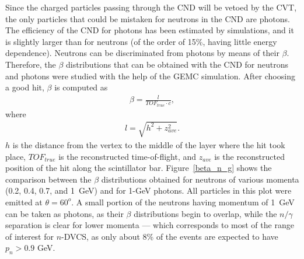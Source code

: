 Since the charged particles passing through the CND will be vetoed by the CVT, the only particles that could be mistaken for neutrons in the CND are photons. The efficiency of the CND for photons has been estimated by simulations, and it is slightly larger than for neutrons (of the order of 15\%, having little energy dependence). 
Neutrons can be discriminated from photons by means of their $\beta$.
Therefore, the $\beta$ distributions that can be obtained with the CND for neutrons and photons were studied with the help of the GEMC simulation.
After choosing a good hit, $\beta$ is computed as  %
%
\begin{eqnarray}\label{beta_def}
\beta = \frac{l}{TOF_{true}\cdot c},
\end{eqnarray}
%
where 
\begin{eqnarray}\label{l_def} 
l = \sqrt{h^{2}+z_{ave}^{2}}.
\end{eqnarray}
%
$h$ is the distance from the vertex to the middle of the layer where the hit took place, $TOF_{true}$ is the reconstructed time-of-flight, and $z_{ave}$ is the reconstructed position of the hit along the scintillator bar. %
%
Figure~\ref{beta_n_g} shows the comparison between the $\beta$ distributions obtained for neutrons of various momenta (0.2, 0.4, 0.7, and 1~GeV) and for 1-GeV photons. All particles in this plot were emitted at $\theta = 60^o$.
A small portion of the neutrons having momentum of 1~GeV can be taken as photons, as their $\beta$ distributions begin to overlap, while the $n/\gamma$ separation is clear for lower momenta --- which corresponds to most of the range of interest for $n$-DVCS, as only about 8\% of the events are expected to have $p_n>0.9$ GeV.
%
